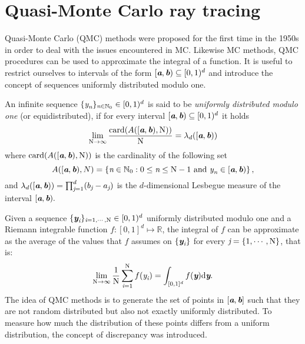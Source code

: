 \section{Quasi-Monte Carlo ray tracing}\label{sec:QMC}
Quasi-Monte Carlo (QMC) methods were proposed for the first time in the 1950s in order to deal with the issues encountered in MC.
Likewise MC methods, QMC procedures can be used to approximate the integral of a function. 
It is useful to restrict ourselves to intervals of the form $[\textit{\textbf{a}}, \textit{\textbf{b}})\subseteq[0,1)^d$ and introduce the concept of sequences uniformly distributed modulo one.
\begin{definition}
An infinite sequence $\{\textit{y}_{\textit{n}}\}_{\textit{n}\in\mathbb{N}_0} \in [0,1)^d$ is said to be \textit{uniformly distributed modulo one} (or equidistributed), if for every interval $[\textit{\textbf{a}},\textit{\textbf{b}})\subseteq[0,1)^d$ it holds
\begin{equation}
\lim_{\textrm{N}\rightarrow \infty}\frac{\textrm{card}(A([\textit{\textbf{a}},\textit{\textbf{b}}), \textrm{N}))}{\textrm{N}} = \lambda_d([\textit{\textbf{a}},\textit{\textbf{b}}))
\end{equation}
where $\textrm{card}(A([\textit{\textbf{a}},\textit{\textbf{b}}), \textrm{N}))$ is the cardinality of the following set
\begin{equation}
A([\textit{\textbf{a}},\textit{\textbf{b}}), N) = \{\textit{n}\in \mathbb{N}_0: 0\leq\textit{n}\leq \textrm{N}-1 \mbox{ and } \textit{y}_{\textit{n}}\in [\textit{\textbf{a}},\textit{\textbf{b}})\}\,,
\end{equation}
and $\lambda_d([\textit{\textbf{a}},\textit{\textbf{b}})) = \prod_{\textit{j}=1}^{d}(b_{\textit{j}}-a_{\textit{j}})$ is the $d$-dimensional Lesbegue measure of the interval $[\textit{\textbf{a}},\textit{\textbf{b}}).$
\end{definition}
Given a sequence $\{\textit{\textbf{y}}_{\textit{i}}\}_{\textit{i} = 1, \cdots, \textrm{N}}\in[0,1)^d$ uniformly distributed modulo one and a 
Riemann integrable function $f:[0,1]^d\mapsto \mathbb{R}$, the integral of $f$ can be approximate as the average of the values that $f$ assumes on $\{\textit{\textbf{y}}_{\textit{i}}\}$ for every $\textit{j}=\{1, \cdots, \textrm{N}\}$, that is:
\begin{equation}
 \lim_{\textrm{N}\rightarrow \infty}\frac{1}{\textrm{N}}\sum_{\textit{i}=1}^{\textrm{N}}f(\textit{y}_{\textit{i}}) = \int_{[0,1]^d}f(\textit{\textbf{y}})\textrm{d}\textit{\textbf{y}}.
\end{equation}
The idea of QMC methods is to generate the set of points in $[\textit{\textbf{a}},\textit{\textbf{b}}]$ such that they are not random distributed but also not exactly uniformly distributed. 
To measure how much the distribution of these points differs from a uniform distribution, the concept of discrepancy was introduced. 
